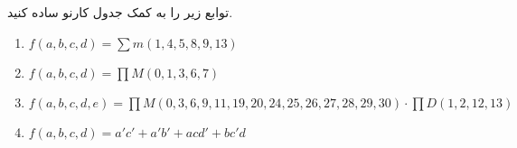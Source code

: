 توابع زیر را به کمک جدول کارنو ساده کنید.

\begin{latin}
	\begin{enumerate}
		\item %
		$f(a,b,c,d)=\sum m(1,4,5,8,9,13)$
		
		\item %
		$f(a,b,c,d)=\prod M(0,1,3,6,7)$
		
		\item %
		$f(a,b,c,d,e)=\prod M(0,3,6,9,11,19,20,24,25,26,27,28,29,30) \cdot \prod D(1,2,12,13)$
		
		\item %
		$f(a,b,c,d)=a'c' + a'b' + acd' + bc'd$
	\end{enumerate} 
\end{latin}

